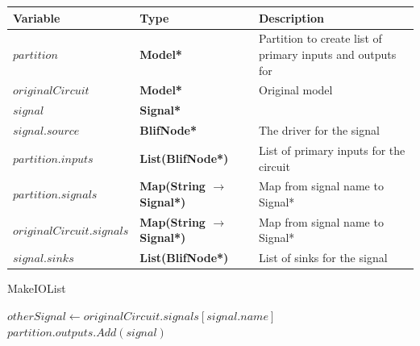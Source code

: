 \documentclass[12pt,final,oneside]{dwThesis} %
\begin{document}
   \begin{algorithm}

      \begin{center}

         \begin{tabularx}
            {\linewidth}{llX} \toprule
            Variable & Type & Description\\
            \midrule $partition$ &\textbf{
               Model* } &  Partition to create list of primary inputs and
            outputs for\\
            $originalCircuit$ &\textbf{  Model* } &  Original
            model \\
            $signal$ &\textbf{  Signal* } &  \\
            $signal.source$
            &\textbf{  BlifNode* } &  The driver for the signal \\

            $partition.inputs$ &\textbf{  List(BlifNode*) } &  List of primary
            inputs for the circuit \\
            $partition.signals$ &\textbf{  Map(String
               $\to$ Signal*) } &  Map from signal name to Signal* \\

            $originalCircuit.signals$ &\textbf{  Map(String $\to$ Signal*) } &
            Map from signal name to Signal* \\
            $signal.sinks$ &\textbf{
               List(BlifNode*) } &  List of sinks for the signal \\


            \bottomrule 
         \end{tabularx}

      \end{center}

      \caption{MakeIOList}\label{makeiolist} 
      \begin{algorithmic}[1]
             
         \EndIf 
         \State $otherSignal \gets originalCircuit.signals[signal.name]$
         \State $partition.outputs.Add(signal)$
         \EndIf \EndFor \EndProcedure 
      \end{algorithmic}

   \end{algorithm}
\end{document}
